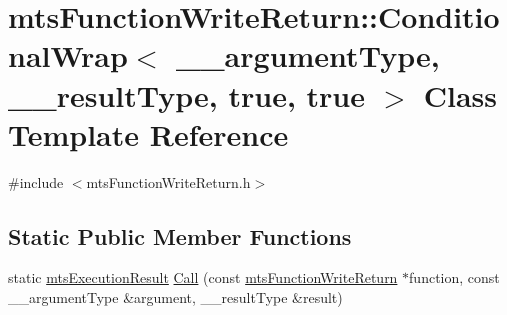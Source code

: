 \hypertarget{classmts_function_write_return_1_1_conditional_wrap_3_01____argument_type_00_01____result_type_00_01true_00_01true_01_4}{\section{mts\-Function\-Write\-Return\-:\-:Conditional\-Wrap$<$ \-\_\-\-\_\-argument\-Type, \-\_\-\-\_\-result\-Type, true, true $>$ Class Template Reference}
\label{classmts_function_write_return_1_1_conditional_wrap_3_01____argument_type_00_01____result_type_00_01true_00_01true_01_4}
}


{\ttfamily \#include $<$mts\-Function\-Write\-Return.\-h$>$}

\subsection*{Static Public Member Functions}
\begin{DoxyCompactItemize}
\item 
static \hyperlink{classmts_execution_result}{mts\-Execution\-Result} \hyperlink{classmts_function_write_return_1_1_conditional_wrap_3_01____argument_type_00_01____result_type_00_01true_00_01true_01_4_a3128694605b92bc7233ae5b77e8de90c}{Call} (const \hyperlink{classmts_function_write_return}{mts\-Function\-Write\-Return} $\ast$function, const \-\_\-\-\_\-argument\-Type \&argument, \-\_\-\-\_\-result\-Type \&result)
\end{DoxyCompactItemize}


